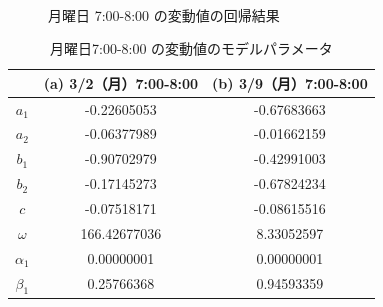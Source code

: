 \documentclass[technicalreport]{ieicej}
\begin{document}
\begin{figure}[tb]
\begin{center}
~
~
\caption{月曜日 7:00-8:00 の変動値の回帰結果}
\label{diff-reg}
\end{center}
\end{figure}

\begin{table}[tb]
\centering
\caption{月曜日7:00-8:00 の変動値のモデルパラメータ}
\label{diff-param}
\begin{tabular}{|c|c|c|}
\hline
&(a) 3/2（月）7:00-8:00&(b) 3/9（月）7:00-8:00\\
\hline
$a_1$&-0.22605053&-0.67683663\\
\hline
$a_2$&-0.06377989&-0.01662159\\
\hline
$b_1$&-0.90702979&-0.42991003\\
\hline
$b_2$&-0.17145273&-0.67824234\\
\hline
$c$&-0.07518171&-0.08615516\\
\hline
$\omega$&166.42677036&8.33052597\\
\hline
$\alpha_1$&0.00000001&0.00000001\\
\hline
$\beta_1$&0.25766368&0.94593359\\
\hline
\end{tabular}
\end{table}
\end{document}

